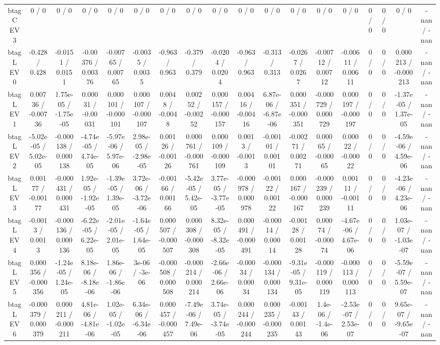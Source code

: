 \documentclass[10pt]{article}
\begin{document}
\begin{table}[htbp]
\begin{center}
\begin{tabular}{|c|c|c|c|c|c|c|c|c|c|c|c|c|c|c|c|c|c|}
  btag C EV 3 & 0 / 0 & 0 / 0 & 0 / 0 & 0 / 0 & 0 / 0 & 0 / 0 & 0 / 0 & 0 / 0 & 0 / 0 & 0 / 0 & 0 / 0 & 0 / 0 & 0 / 0 & 0 / 0 & 0 / 0 & 0 / 0 & -nan / -nan \\ 
  btag L EV 0 & -0.428 / 0.428 & -0.0151 / 0.0151 & -0.00376 / 0.00376 & -0.00765 / 0.00765 & -0.0035 / 0.0035 & -0.963 / 0.963 & -0.379 / 0.379 & -0.0204 / 0.0204 & -0.963 / 0.963 & -0.313 / 0.313 & -0.0267 / 0.0267 & -0.00712 / 0.00712 & -0.00611 / 0.00611 & 0 / 0 & 0 / 0 & 0.000213 / -0.000213 & -nan / -nan \\ 
  btag L EV 1 & 0.00736 / -0.00736 & 1.75e-05 / -1.75e-05 & 0.00031 / -0.00031 & 0.000101 / -0.000101 & 0.000107 / -0.000107 & 0.0048 / -0.0048 & 0.00252 / -0.00252 & 0.000157 / -0.000157 & 0.00416 / -0.00416 & 6.87e-06 / -6.87e-06 & 0.000351 / -0.000351 & -0.000729 / 0.000729 & 0.000197 / -0.000197 & 0 / 0 & 0 / 0 & -1.37e-05 / 1.37e-05 & -nan / -nan \\ 
  btag L EV 2 & -5.02e-05 / 5.02e-05 & -0.000138 / 0.000138 & -4.74e-05 / 4.74e-05 & -5.97e-06 / 5.97e-06 & 2.98e-05 / -2.98e-05 & 0.00126 / -0.00126 & 0.000761 / -0.000761 & 0.000109 / -0.000109 & 0.0013 / -0.0013 & -0.00101 / 0.00101 & -0.00271 / 0.00271 & 0.00065 / -0.00065 & 0.00022 / -0.00022 & 0 / 0 & 0 / 0 & -4.59e-06 / 4.59e-06 & -nan / -nan \\ 
  btag L EV 3 & 0.00177 / -0.00177 & -0.000431 / 0.000431 & 1.92e-05 / -1.92e-05 & -1.39e-05 / 1.39e-05 & 3.72e-06 / -3.72e-06 & -0.00166 / 0.00166 & -5.42e-05 / 5.42e-05 & 3.77e-05 / -3.77e-05 & -0.000978 / 0.000978 & -0.00122 / 0.00122 & 0.000167 / -0.000167 & -0.000239 / 0.000239 & 0.00111 / -0.00111 & 0 / 0 & 0 / 0 & -4.23e-06 / 4.23e-06 & -nan / -nan \\ 
  btag L EV 4 & -0.0013 / 0.0013 & -0.000136 / 0.000136 & -6.22e-05 / 6.22e-05 & -2.01e-05 / 2.01e-05 & -1.64e-05 / 1.64e-05 & 0.000507 / -0.000507 & 0.000308 / -0.000308 & 8.32e-05 / -8.32e-05 & 0.000491 / -0.000491 & -0.00014 / 0.00014 & -0.00128 / 0.00128 & 0.00074 / -0.00074 & -4.67e-06 / 4.67e-06 & 0 / 0 & 0 / 0 & 1.03e-07 / -1.03e-07 & -nan / -nan \\ 
  btag L EV 5 & 0.000356 / -0.000356 & -1.24e-05 / 1.24e-05 & 8.18e-06 / -8.18e-06 & 1.86e-06 / -1.86e-06 & 3e-06 / -3e-06 & -0.000508 / 0.000508 & -0.000214 / 0.000214 & -2.66e-06 / 2.66e-06 & -0.00034 / 0.00034 & -0.000134 / 0.000134 & -9.31e-05 / 9.31e-05 & -0.000119 / 0.000119 & -0.000113 / 0.000113 & 0 / 0 & 0 / 0 & -5.59e-07 / 5.59e-07 & -nan / -nan \\ 
  btag L EV 6 & -0.000379 / 0.000379 & 0.000211 / -0.000211 & 4.81e-06 / -4.81e-06 & 1.02e-05 / -1.02e-05 & 6.34e-06 / -6.34e-06 & 0.000457 / -0.000457 & -7.49e-06 / 7.49e-06 & 3.74e-05 / -3.74e-05 & 0.000244 / -0.000244 & 0.000235 / -0.000235 & -0.00143 / 0.00143 & 1.4e-06 / -1.4e-06 & -2.53e-07 / 2.53e-07 & 0 / 0 & 0 / 0 & 9.65e-07 / -9.65e-07 & -nan / -nan \\ 

\end{tabular}
\end{center}
\end{table}
\end{document}
